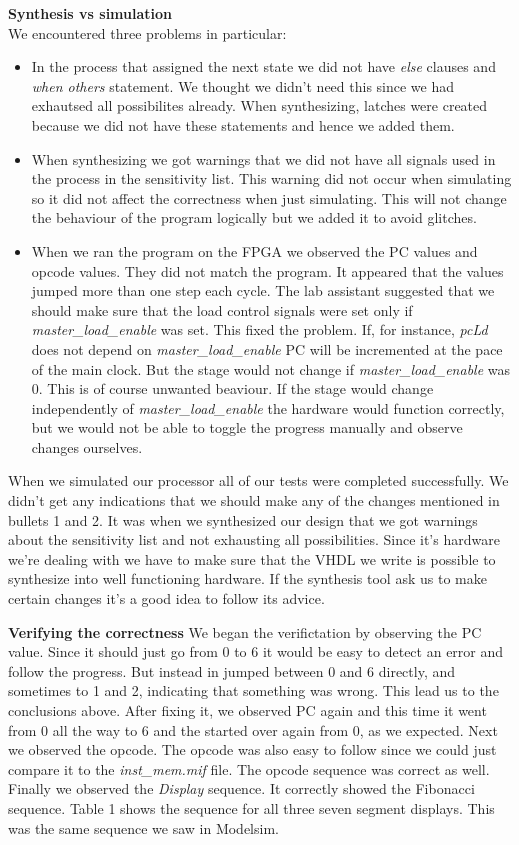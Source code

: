 \documentclass[a4paper,11pt]{article}
\begin{document}
\textbf{Synthesis vs simulation}\\
We encountered three problems in particular:
\begin{itemize}
  \item In the process that assigned the next state we did not have \textit{else} clauses and \textit{when others} statement. We thought we didn't need this since we had exhautsed all possibilites already. When synthesizing, latches were created because we did not have these statements and hence we added them.
  \item When synthesizing we got warnings that we did not have all signals used in the process in the sensitivity list. This warning did not occur when simulating so it did not affect the correctness when just simulating. This will not change the behaviour of the program logically but we added it to avoid glitches.
  \item When we ran the program on the FPGA we observed the PC values and opcode values. They did not match the program. It appeared that the values jumped more than one step each cycle. The lab assistant suggested that we should make sure that the load control signals were set only if \textit{master\_load\_enable} was set. This fixed the problem. If, for instance, \textit{pcLd} does not depend on \textit{master\_load\_enable} PC will be incremented at the pace of the main clock. But the stage would not change if \textit{master\_load\_enable} was 0. This is of course unwanted beaviour. If the stage would change independently of \textit{master\_load\_enable} the hardware would function correctly, but we would not be able to toggle the progress manually and observe changes ourselves.
\end{itemize}

When we simulated our processor all of our tests were completed successfully. We didn't get any indications that we should make any of the changes mentioned in bullets 1 and 2. It was when we synthesized our design that we got warnings about the sensitivity list and not exhausting all possibilities. Since it's hardware we're dealing with we have to make sure that the VHDL we write is possible to synthesize into well functioning hardware. If the synthesis tool ask us to make certain changes it's a good idea to follow its advice. 

\textbf{Verifying the correctness}
We began the verifictation by observing the PC value. Since it should just go from 0 to 6 it would be easy to detect an error and follow the progress. But instead in jumped between 0 and 6 directly, and sometimes to 1 and 2, indicating that something was wrong. This lead us to the conclusions above. After fixing it, we observed PC again and this time it went from 0 all the way to 6 and the started over again from 0, as we expected. Next we observed the opcode. The opcode was also easy to follow since we could just compare it to the \textit{inst\_mem.mif} file. The opcode sequence was correct as well. Finally we observed the \textit{Display} sequence. It correctly showed the Fibonacci sequence. Table 1 shows the sequence for all three seven segment displays. This was the same sequence we saw in Modelsim.
\end{document}
